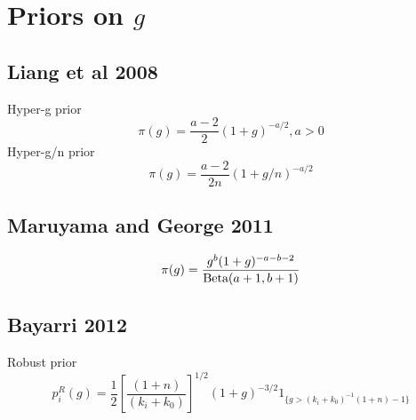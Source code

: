 \documentclass{amsart}[12pt]
\theoremstyle{definition}
\begin{document}
\section{Priors on $g$}

\subsection{Liang et al 2008}
\citep{Liang2008}
Hyper-g prior
$$\pi(g) = \frac{a - 2}{2} (1 + g)^{-a/2}, a > 0$$
Hyper-g/n prior
$$\pi(g) = \frac{a - 2}{2n} (1 + g/n)^{-a/2}$$
\subsection{Maruyama and George 2011}
\citep{Maruyama2011}
$$\pi(g) = \frac{g^b (1 + g)^{-a-b-2}}{\text{Beta}(a + 1, b + 1)}$$
\subsection{Bayarri 2012}
\citep{Bayarri2012}
Robust prior
$$p_i^R(g) = \frac{1}{2} \left[ \frac{(1 + n)}{(k_i + k_0)} \right]^{1/2} (1 + g)^{-3/2} 1_{\{ g > (k_i + k_0)^{-1} (1 + n) - 1 \}}$$


\end{document}
